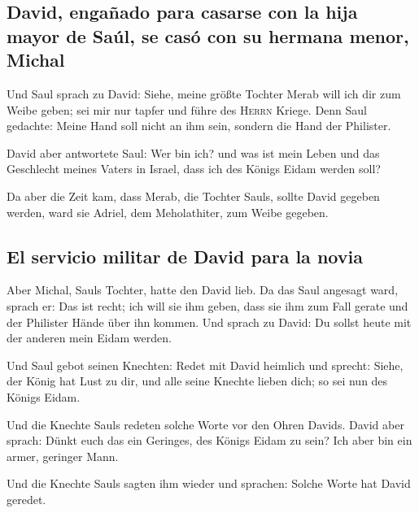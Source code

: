 \hypertarget{david-engauxf1ado-para-casarse-con-la-hija-mayor-de-sauxfal-se-casuxf3-con-su-hermana-menor-michal}{%
\subsection{David, engañado para casarse con la hija mayor de Saúl, se
casó con su hermana menor,
Michal}\label{david-engauxf1ado-para-casarse-con-la-hija-mayor-de-sauxfal-se-casuxf3-con-su-hermana-menor-michal}}

 Und Saul sprach zu David: Siehe, meine größte Tochter
Merab will ich dir zum Weibe geben; sei mir nur tapfer und führe des
\textsc{Herrn} Kriege. Denn Saul gedachte: Meine Hand soll nicht an ihm
sein, sondern die Hand der Philister.

 David aber antwortete Saul: Wer bin ich? und was ist
mein Leben und das Geschlecht meines Vaters in Israel, dass ich des
Königs Eidam werden soll?

 Da aber die Zeit kam, dass Merab, die Tochter Sauls,
sollte David gegeben werden, ward sie Adriel, dem Meholathiter, zum
Weibe gegeben.

\hypertarget{el-servicio-militar-de-david-para-la-novia}{%
\subsection{El servicio militar de David para la
novia}\label{el-servicio-militar-de-david-para-la-novia}}

 Aber Michal, Sauls Tochter, hatte den David lieb. Da das
Saul angesagt ward, sprach er: Das ist recht;  ich will
sie ihm geben, dass sie ihm zum Fall gerate und der Philister Hände über
ihn kommen. Und sprach zu David: Du sollst heute mit der anderen mein
Eidam werden.

 Und Saul gebot seinen Knechten: Redet mit David heimlich
und sprecht: Siehe, der König hat Lust zu dir, und alle seine Knechte
lieben dich; so sei nun des Königs Eidam.

 Und die Knechte Sauls redeten solche Worte vor den Ohren
Davids. David aber sprach: Dünkt euch das ein Geringes, des Königs Eidam
zu sein? Ich aber bin ein armer, geringer Mann.

 Und die Knechte Sauls sagten ihm wieder und sprachen:
Solche Worte hat David geredet.

